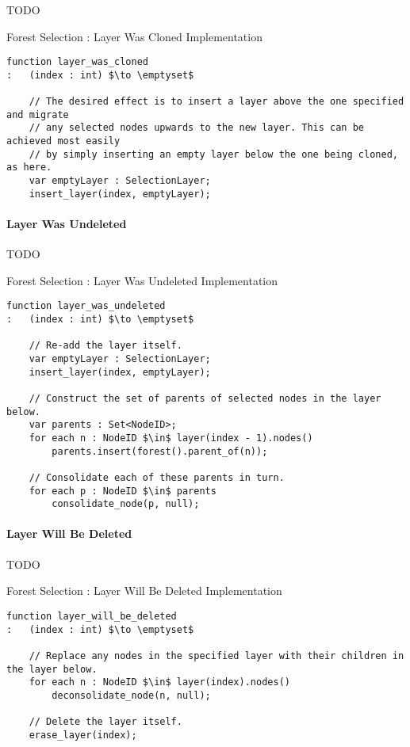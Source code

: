 TODO

\begin{stulisting}[p]
\caption{Forest Selection : Layer Was Cloned Implementation}
\label{code:ipfs-selection-layerwascloned}
\begin{lstlisting}[style=Default]
function layer_was_cloned
:	(index : int) $\to \emptyset$

	// The desired effect is to insert a layer above the one specified and migrate
	// any selected nodes upwards to the new layer. This can be achieved most easily
	// by simply inserting an empty layer below the one being cloned, as here.
	var emptyLayer : SelectionLayer;
	insert_layer(index, emptyLayer);
\end{lstlisting}
\end{stulisting}

\paragraph{Layer Was Undeleted}

TODO

\begin{stulisting}[p]
\caption{Forest Selection : Layer Was Undeleted Implementation}
\label{code:ipfs-selection-layerwasundeleted}
\begin{lstlisting}[style=Default]
function layer_was_undeleted
:	(index : int) $\to \emptyset$

	// Re-add the layer itself.
	var emptyLayer : SelectionLayer;
	insert_layer(index, emptyLayer);

	// Construct the set of parents of selected nodes in the layer below.
	var parents : Set<NodeID>;
	for each n : NodeID $\in$ layer(index - 1).nodes()
		parents.insert(forest().parent_of(n));

	// Consolidate each of these parents in turn.
	for each p : NodeID $\in$ parents
		consolidate_node(p, null);
\end{lstlisting}
\end{stulisting}

\paragraph{Layer Will Be Deleted}

TODO

\begin{stulisting}[p]
\caption{Forest Selection : Layer Will Be Deleted Implementation}
\label{code:ipfs-selection-layerwillbedeleted}
\begin{lstlisting}[style=Default]
function layer_will_be_deleted
:	(index : int) $\to \emptyset$

	// Replace any nodes in the specified layer with their children in the layer below.
	for each n : NodeID $\in$ layer(index).nodes()
		deconsolidate_node(n, null);

	// Delete the layer itself.
	erase_layer(index);
\end{lstlisting}
\end{stulisting}

